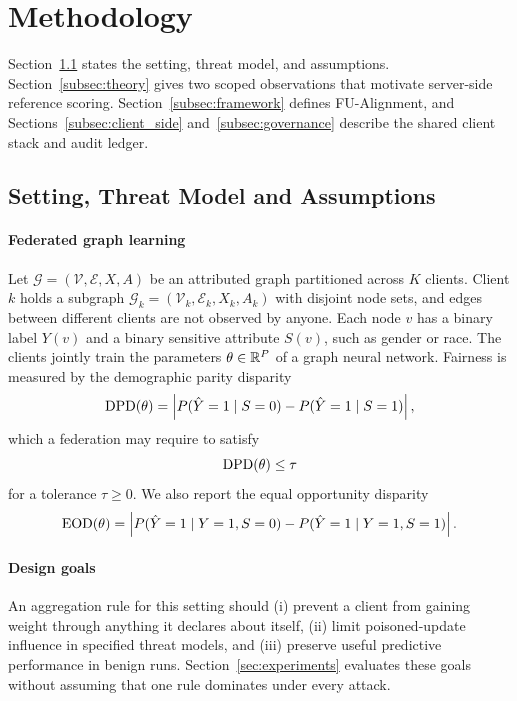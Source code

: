 \section{Methodology}
\label{sec:methodology}

Section~\ref{subsec:problem_formulation} states the setting, threat model, and assumptions. Section~\ref{subsec:theory} gives two scoped observations that motivate server-side reference scoring. Section~\ref{subsec:framework} defines FU-Alignment, and Sections~\ref{subsec:client_side} and~\ref{subsec:governance} describe the shared client stack and audit ledger.

\subsection{Setting, Threat Model and Assumptions}
\label{subsec:problem_formulation}

\paragraph{Federated graph learning}
Let $\mathcal{G} = (\mathcal{V}, \mathcal{E}, X, A)$ be an attributed graph partitioned across $K$ clients. Client $k$ holds a subgraph $\mathcal{G}_k = (\mathcal{V}_k, \mathcal{E}_k, X_k, A_k)$ with disjoint node sets, and edges between different clients are not observed by anyone. Each node $v$ has a binary label $Y(v)$ and a binary sensitive attribute $S(v)$, such as gender or race. The clients jointly train the parameters $\theta \in \mathbb{R}^P$ of a graph neural network. Fairness is measured by the demographic parity disparity
\begin{equation}
\label{eq:dpd_def}
\mathrm{DPD}(\theta) = \left| P(\hat{Y}=1 \mid S=0) - P(\hat{Y}=1 \mid S=1) \right|,
\end{equation}
which a federation may require to satisfy
\begin{equation}
\label{eq:dpd_constraint}
\mathrm{DPD}(\theta) \le \tau
\end{equation}
for a tolerance $\tau \ge 0$. We also report the equal opportunity disparity
\begin{equation}
\label{eq:eod_def}
\mathrm{EOD}(\theta) = \left| P(\hat{Y}=1 \mid Y=1, S=0) - P(\hat{Y}=1 \mid Y=1, S=1) \right|.
\end{equation}

\paragraph{Design goals}
An aggregation rule for this setting should (i) prevent a client from gaining weight through anything it declares about itself, (ii) limit poisoned-update influence in specified threat models, and (iii) preserve useful predictive performance in benign runs. Section~\ref{sec:experiments} evaluates these goals without assuming that one rule dominates under every attack.


